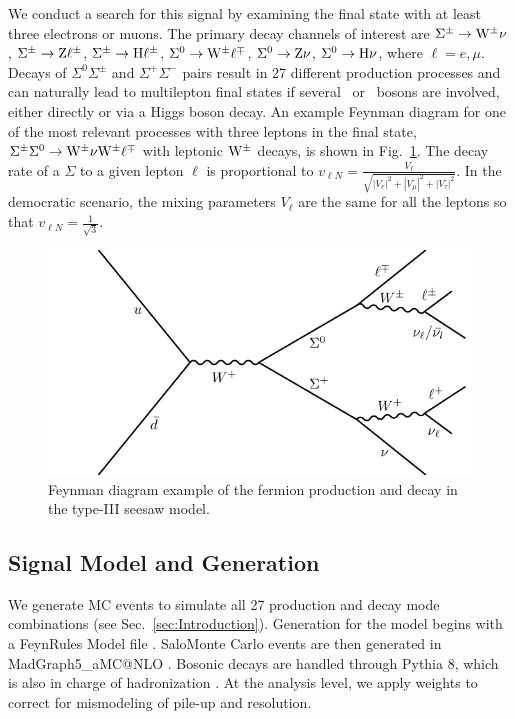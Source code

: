 We conduct a search for this signal by examining the final state with at least three electrons or muons. The primary decay channels of interest are $\Sigma^\pm \to \mathrm{W}^\pm \nu$, $\Sigma^\pm \to \mathrm{Z} \ell^\pm$, $\Sigma^\pm \to \mathrm{H} \ell^\pm$, $\Sigma^0 \to \mathrm{W}^\pm \ell^\mp$, $\Sigma^0 \to \mathrm{Z} \nu$, $\Sigma^0 \to \mathrm{H} \nu$, where $\ell = e, \mu$. Decays of $\Sigma^0 \Sigma^\pm$ and $\Sigma^+ \Sigma^-$ pairs result in 27 different production processes and can naturally lead to multilepton final states if several \PW\ or \Z\ bosons are involved, either directly or via a Higgs boson decay. An example Feynman diagram for one of the most relevant processes with three leptons in the final state, $\Sigma^\pm \Sigma^0 \to \mathrm{W}^\pm \nu \mathrm{W}^\pm \ell^\mp$ with leptonic $\mathrm{W}^\pm$ decays, is shown in Fig.~\ref{fig:SeesawDecay}.
The decay rate of a $\Sigma$ to a given lepton $\ell$ is proportional to $v_{\ell N} = \frac{V_\ell}{\sqrt{|V_e|^2 + |V_\mu|^2 + |V_\tau|^2}}$. In the democratic scenario, the mixing parameters $V_\ell$ are the same for all the leptons so that $v_{\ell N} = \frac{1}{\sqrt{3}}$.

\begin{figure}
\begin{center}
	\includegraphics[width=.5\textwidth]{Introduction/Seesaw}
	\caption{Feynman diagram example of the fermion production and decay in the type-III seesaw model.
	\label{fig:SeesawDecay}}
\end{center}
\end{figure}


\subsection{Signal Model and Generation}
\label{sec:Samples/Signal}

We generate MC events to simulate all 27 production and decay mode combinations (see Sec.~\ref{sec:Introduction}). Generation for the model begins with a FeynRules Model file \cite{SeesawIII_Biggio}. SaloMonte Carlo events are then generated in MadGraph5\_aMC@NLO \cite{Alwall:2014hca}. Bosonic decays are handled through Pythia 8, which is also in charge of hadronization \cite{Sjostrand:2007gs}. At the analysis level, we apply weights to correct for mismodeling of pile-up and \MET resolution.

